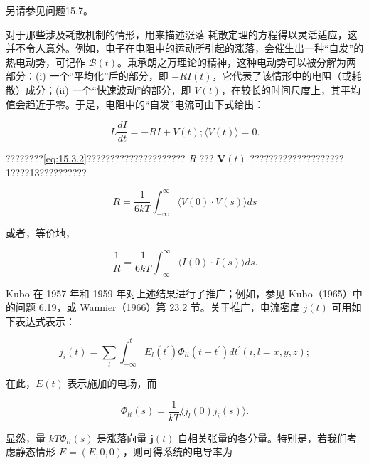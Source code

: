 另请参见问题15.7。

对于那些涉及耗散机制的情形，用来描述涨落-耗散定理的方程得以灵活适应，这并不令人意外。例如，电子在电阻中的运动所引起的涨落，会催生出一种``自发''的热电动势，可记作 \(\mathcal{B}(t)\)。秉承朗之万理论的精神，这种电动势可以被分解为两部分：(i) 一个``平均化''后的部分，即 \(-RI(t)\)，它代表了该情形中的电阻（或耗散）成分；(ii) 一个``快速波动''的部分，即 \(V(t)\)，在较长的时间尺度上，其平均值会趋近于零。于是，电阻中的``自发''电流可由下式给出：

\begin{equation}\tag{15.4.67}\label{eq:15.4.67}
L \frac { d I } { d t } = - R I + V ( t ) ;  \langle V ( t ) \rangle = 0 .
\end{equation}

????????\autoref{eq:15.3.2}????????????????????? \(R\) ??? \(\mathbf{V}(t)\) ????????????????????1????13??????????

\begin{equation}\tag{15.4.68}\label{eq:15.4.68}
R = \frac { 1 } { 6 k T } \int _ { - \infty } ^{\infty} \langle V ( 0 ) \cdot V ( s ) \rangle d s
\end{equation}

或者，等价地，

\begin{equation}\tag{15.4.69}\label{eq:15.4.69}
\frac { 1 } { R } = \frac { 1 } { 6 k T } \int _ { - \infty } ^{\infty} \langle I ( 0 ) \cdot I ( s ) \rangle d s .
\end{equation}

Kubo 在 1957 年和 1959 年对上述结果进行了推广；例如，参见 Kubo（1965）中的问题 6.19，或 Wannier（1966）第 23.2 节。关于推广，电流密度 \(j(t)\) 可用如下表达式表示：

\begin{equation}\tag{15.4.70}\label{eq:15.4.70}
j _ { i } ( t ) = \sum _ { l } \int _ { - \infty } ^{t} E _ { l } ( t ^{\prime} ) \Phi _ { l i } ( t - t ^{\prime} ) d t ^{\prime}  ( i , l = x , y , z ) ;
\end{equation}

在此，\(E(t)\) 表示施加的电场，而

\begin{equation}\tag{15.4.71}\label{eq:15.4.71}
\Phi _ { l i } ( s ) = \frac { 1 } { k T } \langle j _ { l } ( 0 ) j _ { i } ( s ) \rangle .
\end{equation}

显然，量 \(kT\Phi_{li}(s)\) 是涨落向量 \(\mathbf{j}(t)\) 自相关张量的各分量。特别是，若我们考虑静态情形 \(E=(E,0,0)\)，则可得系统的电导率为

